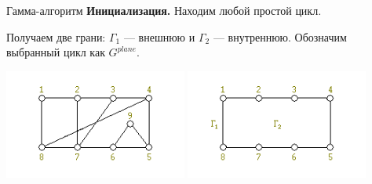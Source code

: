 \documentclass[10pt]{beamer}
\begin{document}
\begin{frame}[fragile]{Гамма-алгоритм}
 \textbf{Инициализация.} Находим любой простой цикл. 
 
 Получаем две грани: $\Gamma_1$ — внешнюю и $\Gamma_2$ — внутреннюю. Обозначим выбранный цикл как $G^{plane}$. 
\begin{center}
    \includegraphics[width=6cm]{Term_2/Source/images/5_gamma_1.png}
    \includegraphics[width=6cm]{Term_2/Source/images/5_gamma_2.png}
\end{center}
\end{frame}
\end{document}
